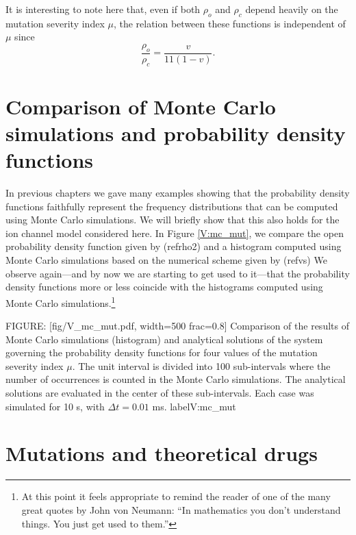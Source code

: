 It is interesting to note here that, even if both $\rho_o$ and $\rho_c$ depend heavily on the mutation severity 
index $\mu$, the relation between these functions is independent of $\mu$ since
\[ \frac{\rho_o}{\rho_c}=\frac{v}{11(1-v)}. \]

\section[Comparison of MCs and PDFs]{Comparison of Monte Carlo simulations and probability density functions}


In previous chapters we gave many examples showing that the probability density
functions faithfully represent the frequency distributions that can be
computed using Monte Carlo simulations. We will briefly show that this also
holds for the ion channel model considered here. In Figure \ref{V:mc_mut}, we compare the
open probability density function given by (ref{rho2}) and a
histogram computed using Monte Carlo simulations based on the numerical scheme
given by (ref{vs})  We observe again---and by now we are starting to get used to it---that the probability density functions 
more or less coincide with the histograms computed using Monte Carlo simulations.\footnote{At this point
it feels appropriate to remind the reader of one of the many great quotes by John von Neumann: 
{``In mathematics you don't understand things. You just get used to them.''}
}

FIGURE: [fig/V_mc_mut.pdf, width=500 frac=0.8] Comparison of the results of Monte Carlo simulations (histogram) and 
analytical solutions of the system
governing the probability density functions for four values of the mutation severity 
index $\mu$. The unit interval is divided into 100 sub-intervals where the 
number of occurrences is counted in the Monte Carlo simulations. The analytical solutions are evaluated in the center of these sub-intervals. Each case was simulated for 10 s, with $\Delta t=0.01$ ms. label{V:mc_mut}
\section{Mutations and theoretical drugs}

